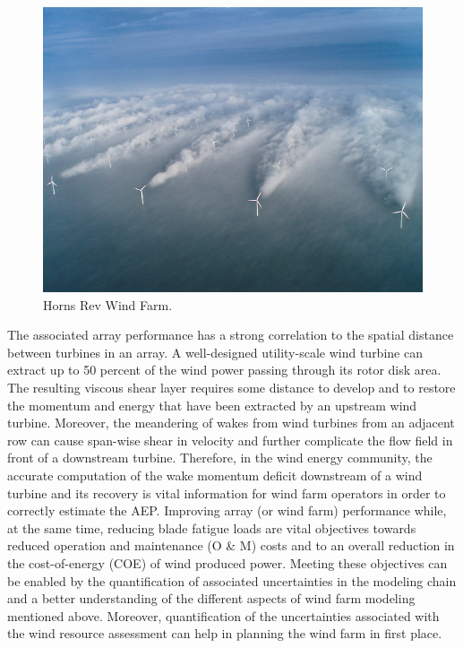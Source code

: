 \documentclass[]{aiaa-tc}%
\begin{document}
\begin{figure}
 \includegraphics[scale=0.5]{HornsRev.png}
 \caption{Horns Rev Wind Farm.}
 \label{f:HornsRev}
\end{figure}

The associated array performance has a strong correlation to the spatial distance between turbines in an array. A well-designed utility-scale wind turbine can extract up to 50 percent of the wind power passing through its rotor disk area. The resulting viscous shear layer requires some distance to develop and to restore the momentum and energy that have been extracted by an upstream wind turbine. Moreover, the meandering of wakes from wind turbines from an adjacent row can cause span-wise shear in velocity and further complicate the flow field in front of a downstream turbine. Therefore, in the wind energy community, the accurate computation of the wake momentum deficit downstream of a wind turbine and its recovery is vital information for wind farm operators in order to correctly estimate the AEP. Improving array (or wind farm) performance while, at the same time, reducing blade fatigue loads are vital objectives towards reduced operation and maintenance (O \& M) costs and to an overall reduction in the cost-of-energy (COE) of wind produced power. Meeting these objectives can be enabled by the quantification of associated uncertainties in the modeling chain and a better understanding of the different aspects of wind farm modeling mentioned above. Moreover, quantification of the uncertainties associated with the wind resource assessment can help in planning the wind farm in first place.
\end{document}
